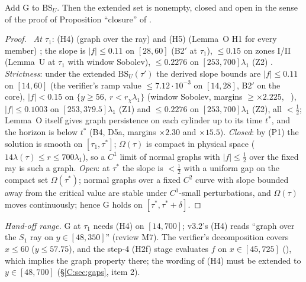 \documentclass[11pt]{article}
\begin{document}
\begin{lemma}\label{C:lem:G}
Add $\mathrm{G}$ to $\mathrm{BS}_U$. Then the extended set is nonempty, closed and open in the sense of the proof of Proposition ``closure'' of .
\end{lemma}
\begin{proof}\tP\ \emph{At $\tau_1$}: (H4) (graph over the ray) and (H5) (Lemma~O H1 for every member) \tH; the slope is $|f|\le0.11$ on $[28,60]$ (B2$'$ at $\tau_1$), $\le0.15$ on zones I/II (Lemma~U at $\tau_1$ with window Sobolev), $\le0.2276$ on $[253,700]\lambda_1$ (Z2) \tC. \emph{Strictness}: under the extended $\mathrm{BS}_U(\tau')$ the derived slope bounds are $|f|\le0.11$ on $[14,60]$ (the verifier's ramp value $\le7.12\cdot10^{-3}$ on $[14,28]$, B2$'$ on the core), $|f|<0.15$ on $\{y\ge56,\ r<r_\chi\lambda_1\}$ (window Sobolev, margins $\ge\times2.225$, \SU\ ), $|f|\le0.1003$ on $[253,379.5]\lambda_1$ (Z1) and $\le0.2276$ on $[253,700]\lambda_1$ (Z2), all $<\frac12$; Lemma~O itself gives graph persistence on each cylinder up to its time $t^*$, and the horizon is below $t^*$ (B4, D5a, margins $\times2.30$ and $\times15.5$). \emph{Closed}: by (P1) the solution is smooth on $[\tau_1,\tau^*]$; $\Omega(\tau)$ is compact in physical space ($14\lambda(\tau)\le r\le700\lambda_1$), so a $C^1$ limit of normal graphs with $|f|\le\frac12$ over the fixed ray is such a graph. \emph{Open}: at $\tau^*$ the slope is $<\frac12$ with a uniform gap on the compact set $\Omega(\tau^*)$; normal graphs over a fixed $C^2$ curve with slope bounded away from the critical value are stable under $C^1$-small perturbations, and $\Omega(\tau)$ moves continuously; hence G holds on $[\tau^*,\tau^*+\delta]$.
\end{proof}
\noindent\emph{Hand-off range.} G at $\tau_1$ needs (H4) on $[14,700]$; v3.2's (H4) reads ``graph over the $S_1$ ray on $y\in[48,350]$'' (review M7). The verifier's decomposition covers $x\le60$ ($y\le57.75$), and the step-4 (H2f) stage evaluates $f$ on $x\in[45,725]$ (), which implies the graph property there; the wording of (H4) must be extended to $y\in[48,700]$ (\S\ref{C:sec:gaps}, item 2).
\end{document}
